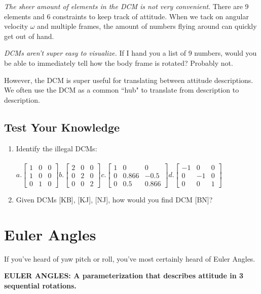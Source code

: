 \documentclass[a4paper,14pt]{extreport}
\begin{document}
\emph{The sheer amount of elements in the DCM is not very convenient}. There are 9 elements and 6 constraints to keep track of attitude. When we tack on angular velocity $\omega$ and multiple frames, the amount of numbers flying around can quickly get out of hand.

\emph{DCMs aren't super easy to visualize.} If I hand you a list of 9 numbers, would you be able to immediately tell how the body frame is rotated? Probably not.

However, the DCM is super useful for translating between attitude descriptions. We often use the DCM as a common ``hub" to translate from description to description.

\section{Test Your Knowledge}
\begin{enumerate}
\item Identify the illegal DCMs:\\\\
	$
	a.
	\begin{bmatrix}
			1&0&0\\
			1&0&0\\
			0&1&0
	\end{bmatrix} 
	b.	
	\begin{bmatrix}
			2&0&0\\
			0&2&0\\
			0&0&2
	\end{bmatrix}
	c.	
	\begin{bmatrix}
			1&0&0\\
			0&0.866&-0.5\\
			0&0.5&0.866
	\end{bmatrix}
	d.
	\begin{bmatrix}
			-1&0&0\\
			0&-1&0\\
			0&0&1
	\end{bmatrix}$ 
\item{Given DCMs [KB], [KJ], [NJ], how would you find DCM [BN]?}
\end{enumerate}

\chapter{Euler Angles}

If you've heard of yaw pitch or roll, you've most certainly heard of Euler Angles.
\begin{center}
\textbf{EULER ANGLES: A parameterization that describes attitude in 3 sequential rotations.}
\end{center}
\end{document}
